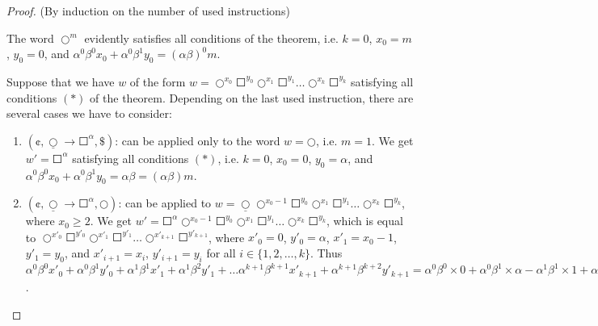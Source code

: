 \begin{proof}
(By induction on the number of used instructions)

The word $\Circle^m$ evidently
satisfies all conditions of the theorem, i.e. $k = 0$, $x_0 = m$, $y_0 = 0$, and
$\alpha^0 \beta^0 x_0 + \alpha^0 \beta^1 y_0 = (\alpha \beta)^0 m$.

Suppose that we have $w$ of the form
$w = \Circle^{x_0} \Square^{y_0} \Circle^{x_1} \Square^{y_1} \ldots \Circle^{x_k} \Square^{y_k}$
satisfying all conditions $(*)$ of the theorem.
Depending on the last used instruction, there are several cases we have to consider:

\begin{enumerate}
\item $(\cent, \underline{\Circle} \to \Square^{\alpha}, \$)$:
can be applied only to the word $w = \Circle$, i.e. $m = 1$. We get $w' = \Square^{\alpha}$ satisfying all conditions $(*)$, i.e. $k = 0$, $x_0 = 0$, $y_0 = \alpha$, and $\alpha^0 \beta^0 x_0 + \alpha^0 \beta^1 y_0 = \alpha \beta = (\alpha \beta) m$.

\item $(\cent, \underline{\Circle} \to \Square^{\alpha}, \Circle)$:
can be applied to $w = \underline{\Circle} \Circle^{x_0 - 1} \Square^{y_0} \Circle^{x_1} \Square^{y_1} \ldots \Circle^{x_k} \Square^{y_k}$, where $x_0 \ge 2$. We get $w' = \Square^{\alpha} \Circle^{x_0 - 1} \Square^{y_0} \Circle^{x_1} \Square^{y_1} \ldots \Circle^{x_k} \Square^{y_k}$, which is equal to $\Circle^{x'_0} \Square^{y'_0} \Circle^{x'_1} \Square^{y'_1} \ldots \Circle^{x'_{k+1}} \Square^{y'_{k+1}}$, where $x'_0 = 0$, $y'_0 = \alpha$, $x'_1 = x_0 - 1$, $y'_1 = y_0$, and $x'_{i+1} = x_i$, $y'_{i+1} = y_i$ for all $i \in \{1, 2, \ldots, k\}$. Thus $\alpha^0 \beta^0 x'_0 + \alpha^0 \beta^1 y'_0 + \alpha^1 \beta^1 x'_1 + \alpha^1 \beta^2 y'_1 + \ldots \alpha^{k+1} \beta^{k+1} x'_{k+1} + \alpha^{k+1} \beta^{k+2} y'_{k+1} = \alpha^0 \beta^0 \times 0 + \alpha^0 \beta^1 \times \alpha - \alpha^1 \beta^1 \times 1 + \alpha^1 \beta^1 (\alpha^0 \beta^0 x_0 + \alpha^0 \beta^1 y_0 + \ldots \alpha^k \beta^k x_k + \alpha^k \beta^{k+1} y_k) = (\alpha \beta) \times (\alpha \beta)^l m = (\alpha \beta)^{l+1} m$.


\end{enumerate}
\end{proof}
